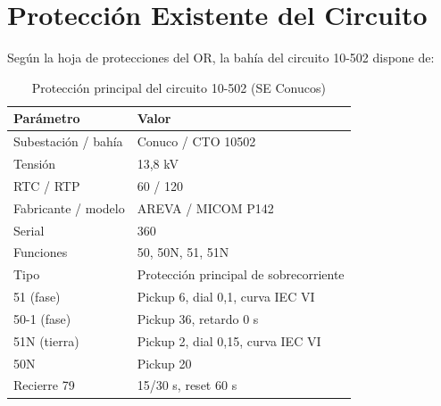 \section{Protección Existente del Circuito}

Según la hoja de protecciones del OR, la bahía del circuito 10-502 dispone de:

\begin{table}[H]
    \centering
    \small
    \caption{Protección principal del circuito 10-502 (SE Conucos)}
    \begin{tabular}{ll}
    \toprule
    \textbf{Parámetro} & \textbf{Valor} \\
    \midrule
    Subestación / bahía & Conuco / CTO 10502 \\
    Tensión & 13,8 kV \\
    RTC / RTP & 60 / 120 \\
    Fabricante / modelo & AREVA / MICOM P142 \\
    Serial & 360 \\
    Funciones & 50, 50N, 51, 51N \\
    Tipo & Protección principal de sobrecorriente \\
    51 (fase) & Pickup 6, dial 0,1, curva IEC VI \\
    50-1 (fase) & Pickup 36, retardo 0 s \\
    51N (tierra) & Pickup 2, dial 0,15, curva IEC VI \\
    50N & Pickup 20 \\
    Recierre 79 & 15/30 s, reset 60 s \\
    \bottomrule
    \end{tabular}
\end{table}

